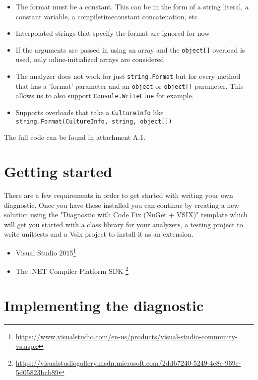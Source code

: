 \begin{itemize}
\item The format must be a constant. This can be in the form of a string literal, a constant variable, a \gls{compiletimeconstant} concatenation, etc
\item Interpolated strings that specify the format are ignored for now
\item If the arguments are passed in using an array and the \texttt{object[]} overload is used, only inline-initialized arrays are considered
\item The analyzer does not work for just \texttt{string.Format} but for every method that has a 'format' parameter and an \texttt{object} or \texttt{object[]} parameter. This allows us to also support \texttt{Console.WriteLine} for example.
\item Supports overloads that take a \texttt{CultureInfo} like \texttt{string.Format(CultureInfo, string, object[])}
\end{itemize}

The full code can be found in attachment A.1. %


\section{Getting started}
\label{sec:diagnostic-getting-started}

There are a few requirements in order to get started with writing your own diagnostic. Once you have these installed you can continue by creating a new \gls{solution} using the "Diagnostic with Code Fix (NuGet + VSIX)" template which will get you started with a class library for your analyzers, a testing project to write \glspl{unittest} and a Vsix project to install it as an extension.

\begin{itemize}
\item Visual Studio 2015\footnote{\url{https://www.visualstudio.com/en-us/products/visual-studio-community-vs.aspx}}
\item The .NET Compiler Platform SDK \footnote{\url{https://visualstudiogallery.msdn.microsoft.com/2ddb7240-5249-4c8c-969e-5d05823bcb89}}
\end{itemize}

\section{Implementing the diagnostic}
\label{sec:diagnostic-implementation}

